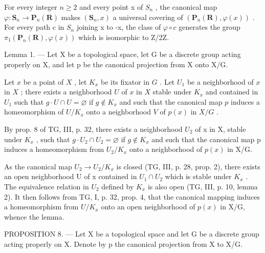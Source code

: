 For every integer \(n \geqslant 2\) and every point x of \(S_{n}\) , the canonical map \(\varphi: \mathbf{S}_{n} \to \mathbf{P}_{n}(\mathbf{R})\) makes \((\mathbf{S}_{n}, x)\) a universal covering of \((\mathbf{P}_{n}(\mathbf{R}), \varphi(x))\) . For every path c in \(S_{n}\) joining x to -x, the class of \(\varphi \circ c\) generates the group \(\pi_{1}(\mathbf{P}_{n}(\mathbf{R}), \varphi(x))\) which is isomorphic to Z/2Z.


Lemma 1. --- Let X be a topological space, let G be a discrete group acting properly on X, and let p be the canonical projection from X onto X/G.

Let \(x\) be a point of \(X\) , let \(K_x\) be its fixator in \(G\) . Let \(U_1\) be a neighborhood of \(x\) in \(X\) ; there exists a neighborhood \(U\) of \(x\) in \(X\) stable under \(K_x\) and contained in \(U_1\) such that \(g \cdot U \cap U = \varnothing\) if \(g \notin K_x\) and such that the canonical map \(p\) induces a homeomorphism of \(U / K_x\) onto a neighborhood \(V\) of \(p(x)\) in \(X / G\) .

By prop. 8 of TG, III, p. 32, there exists a neighborhood \(U_{2}\) of x in X, stable under \(K_{x}\) , such that \(g \cdot U_{2} \cap U_{2} = \varnothing\) if \(g \notin K_{x}\) and such that the canonical map p induces a homeomorphism from \(U_{2}/K_{x}\) onto a neighborhood of \(p(x)\) in X/G.

As the canonical map \(U_{2} \rightarrow U_{2}/K_{x}\) is closed (TG, III, p. 28, prop. 2), there exists an open neighborhood U of x contained in \(U_{1} \cap U_{2}\) which is stable under \(K_{x}\) . The equivalence relation in \(U_{2}\) defined by \(K_{x}\) is also open (TG, III, p. 10, lemma 2). It then follows from TG, I, p. 32, prop. 4, that the canonical mapping induces a homeomorphism from \(U/K_{x}\) onto an open neighborhood of \(p(x)\) in X/G, whence the lemma.

PROPOSITION 8. --- Let X be a topological space and let G be a discrete group acting properly on X. Denote by p the canonical projection from X to X/G.

